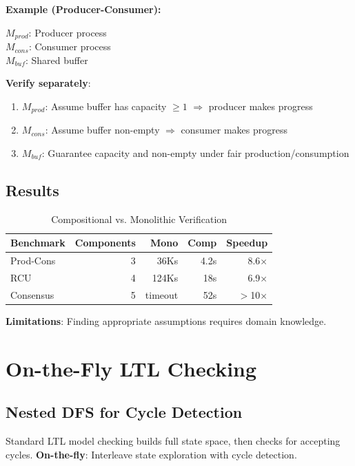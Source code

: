 \documentclass[conference]{IEEEtran}
\begin{document}
\textbf{Example (Producer-Consumer):}

$M_{prod}$: Producer process\\
$M_{cons}$: Consumer process\\
$M_{buf}$: Shared buffer

\textbf{Verify separately}:
\begin{enumerate}
\item $M_{prod}$: Assume buffer has capacity $\geq 1$ $\Rightarrow$ producer makes progress
\item $M_{cons}$: Assume buffer non-empty $\Rightarrow$ consumer makes progress
\item $M_{buf}$: Guarantee capacity and non-empty under fair production/consumption
\end{enumerate}

\subsection{Results}

\begin{table}[h]
\centering
\caption{Compositional vs. Monolithic Verification}
\label{tab:compositional_results}
\begin{tabular}{lrrrr}
\toprule
\textbf{Benchmark} & \textbf{Components} & \textbf{Mono} & \textbf{Comp} & \textbf{Speedup} \\
\midrule
Prod-Cons & 3 & 36Ks & 4.2s & 8.6× \\
RCU & 4 & 124Ks & 18s & 6.9× \\
Consensus & 5 & timeout & 52s & $>$10× \\
\bottomrule
\end{tabular}
\end{table}

\textbf{Limitations}: Finding appropriate assumptions requires domain knowledge.

\section{On-the-Fly LTL Checking}
\label{sec:onthefly}

\subsection{Nested DFS for Cycle Detection}

Standard LTL model checking builds full state space, then checks for accepting cycles. \textbf{On-the-fly}: Interleave state exploration with cycle detection.
\end{document}
